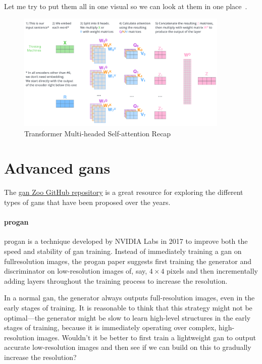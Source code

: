 Let me try to put them all in one visual so we can look at them in one place~.

\begin{figure}
	\begin{center}
		\includegraphics[width=0.9\textwidth]{figures/transformer_multi-headed_self-attention-recap}
	\end{center}
	\caption{Transformer Multi-headed Self-attention Recap}\label{fig:transformer_multi-headed_self-attention-recap}
\end{figure}

\section{Advanced \glspl{gan}}

The \href{https://github.com/hindupuravinash/the-gan-zoo}{\gls{gan} Zoo GitHub repository} is a great resource for exploring the different types of \glspl{gan} that have been proposed over the years.

\paragraph{\gls{progan}~\cite{Karras2018Feb}}

\gls{progan} is a technique developed by NVIDIA Labs in 2017 to improve both the speed and stability of \gls{gan} training.
Instead of immediately training a \gls{gan} on fullresolution images, the \gls{progan} paper suggests first training the generator and discriminator on low-resolution images of, say, \( 4 \times  4 \) pixels and then incrementally adding layers throughout the training process to increase the resolution.

In a normal \gls{gan}, the generator always outputs full-resolution images, even in the early stages of training.
It is reasonable to think that this strategy might not be optimal—the generator might be slow to learn high-level structures in the early stages of training, because it is immediately operating over complex, high-resolution images.
Wouldn’t it be better to first train a lightweight \gls{gan} to output accurate low-resolution images and then see if we can build on this to gradually increase the resolution?

